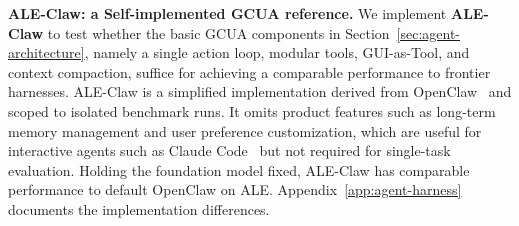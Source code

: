\documentclass{llmxive}
\begin{document}
\noindent \textbf{ALE-Claw: a Self-implemented GCUA reference.}
We implement \textbf{ALE-Claw} to test whether the basic GCUA components in Section~\ref{sec:agent-architecture}, namely a single action loop, modular tools, GUI-as-Tool, and context compaction, suffice for achieving a comparable performance to frontier harnesses.
ALE-Claw is a simplified implementation derived from OpenClaw~\citep{openclaw2026agent} and scoped to isolated benchmark runs.
It omits product features such as long-term memory management and user preference customization, which are useful for interactive agents such as Claude Code~\citep{anthropic2025claudecode} but not required for single-task evaluation.
Holding the foundation model fixed, ALE-Claw has comparable performance to default OpenClaw on ALE. Appendix~\ref{app:agent-harness} documents the implementation differences.
\end{document}
